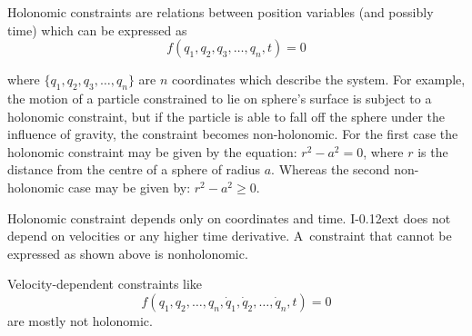 {\small\setlength{\abovedisplayskip}{2pt}\setlength{\belowdisplayskip}{2pt}

Holonomic constraints are relations between position variables (and possibly time) which can be expressed as
\[ f(q_{1}, q_{2}, q_{3}, \ldots, q_{n}, t) = 0 \]

\noindent where ${\{q_{1},q_{2},q_{3},\ldots,q_{n}\}}$ are $n$ coordinates which describe the system. For example, the motion of a particle constrained to lie on sphere’s surface is subject to a holonomic constraint, but if the particle is able to fall off the sphere under the influence of gravity, the constraint becomes non-holonomic. For the first case the holonomic constraint may be given by the equation: ${r^{2} - a^{2} = 0}$, where $r$ is the distance from the centre of a sphere of radius $a$. Whereas the second non-holonomic case may be given by: ${r^{2} - a^{2} \geq 0}$.

Holonomic constraint depends only on coordinates and time. I\kern-0.12ext does not depend on velocities or any higher time derivative. A~constraint that cannot be expressed as shown above is nonholonomic.

Velocity-dependent constraints like
\[ \displaystyle f(q_{1}, q_{2}, \ldots, q_{n}, {\dot {q}}_{1}, {\dot {q}}_{2}, \ldots, {\dot {q}}_{n}, t) = 0 \]
are mostly not holonomic.
\par}





\label{para:virtualworkprinciple.genericmechanics}

